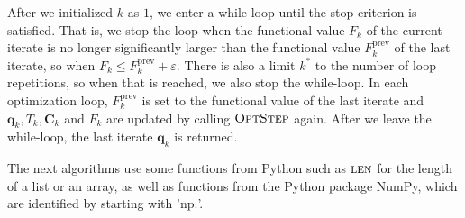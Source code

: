 After we initialized $k$ as $1$, we enter a while-loop until the stop criterion is satisfied. That is, we stop the loop when the functional value $F_k$ of the current iterate is no longer significantly larger than the functional value $F^\mathrm{prev}_k$ of the last iterate, so when $F_k\leq F^\mathrm{prev}_k+\varepsilon$. There is also a limit $k^*$ to the number of loop repetitions, so when that is reached, we also stop the while-loop. In each optimization loop, $F^\mathrm{prev}_{k}$ is set to the functional value of the last iterate and $\mathbf{q}_k,T_k,\mathbf{C}_k$ and $F_k$ are updated by calling $\textproc{OptStep}$ again. After we leave the while-loop, the last iterate $\mathbf{q}_k$ is returned.

The next algorithms use some functions from Python such as $\textproc{len}$ for the length of a list or an array, as well as functions from the Python package NumPy, which are identified by starting with '$\mathrm{np.}$'.

